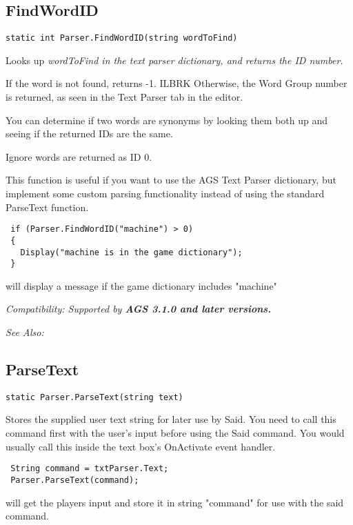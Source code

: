 \subsection{FindWordID}\label{Parser.FindWordID}%

\begin{verbatim}
static int Parser.FindWordID(string wordToFind)
\end{verbatim}
Looks up \it{wordToFind} in the text parser dictionary, and returns the ID number.

If the word is not found, returns -1. ILBRK
Otherwise, the Word Group number is returned, as seen in the Text Parser tab in the editor.

You can determine if two words are synonyms by looking them both up and seeing if the
returned IDs are the same.

Ignore words are returned as ID 0.

This function is useful if you want to use the AGS Text Parser dictionary, but implement
some custom parsing functionality instead of using the standard ParseText function.

\begin{verbatim}
 if (Parser.FindWordID("machine") > 0)
 {
   Display("machine is in the game dictionary");
 }
\end{verbatim}
will display a message if the game dictionary includes "machine"

\it{Compatibility:} Supported by \bf{AGS 3.1.0} and later versions.

\it{See Also:} 


\subsection{ParseText}\label{Parser.ParseText}%

\begin{verbatim}
static Parser.ParseText(string text)
\end{verbatim}
Stores the supplied user text string for later use by Said.
You need to call this command first with the user's input before using
the Said command. You would usually call this inside the text box's
OnActivate event handler.

\begin{verbatim}
 String command = txtParser.Text;
 Parser.ParseText(command);
\end{verbatim}
will get the players input and store it in string "command" for use with the said command.

